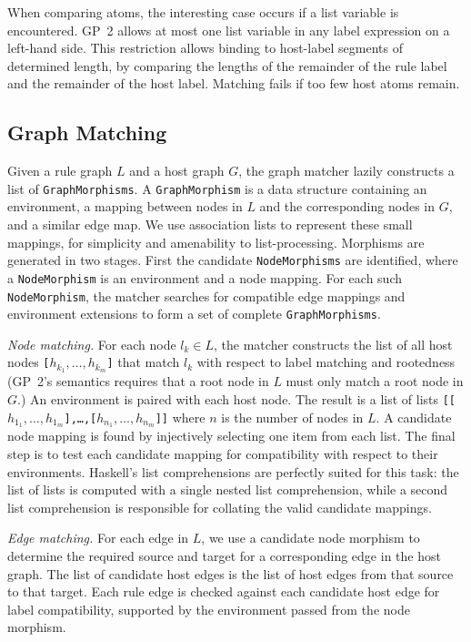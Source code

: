 When comparing atoms, the interesting case occurs if a list variable is encountered. GP~2 allows at most one list variable in any label expression on a left-hand side. This restriction allows binding to host-label segments of determined length, by comparing the lengths of the remainder of the rule label and the remainder of the host label. Matching fails if too few host atoms remain.

\subsection{Graph Matching}\label{sec:graph-match}

Given a rule graph $L$ and a host graph $G$, the graph matcher lazily constructs a list of \texttt{GraphMorphisms}. A \texttt{GraphMorphism} is a data structure containing an environment, a mapping between nodes in $L$ and the corresponding nodes in $G$, and a similar edge map. We use association lists to represent these small mappings, for simplicity and amenability to list-processing.  Morphisms are generated in two stages. First the candidate \texttt{NodeMorphisms} are identified, where a \texttt{NodeMorphism} is an environment and a node mapping. For each such \texttt{NodeMorphism}, the matcher searches for compatible edge mappings and environment extensions to form a set of complete \texttt{GraphMorphisms}.

\vspace{.5\baselineskip}
\noindent
\emph{Node matching.}
For each node $l_k \in L$, the matcher constructs the list of all host nodes \texttt{[$h_{k_1}, \ldots, h_{k_m}$]} that match $l_k$ with respect to label matching and rootedness (GP~2's semantics requires that a root node in $L$ must only match a root node in $G$.) An environment is paired with each host node. The result is a list of lists \texttt{[[$h_{1_1}, \ldots, h_{1_m}$],\ldots,[$h_{n_1}, \ldots, h_{n_m}$]]} where $n$ is the number of nodes in $L$. A candidate node mapping is found by injectively selecting one item from each list. The final step is to test each candidate mapping for compatibility with respect to their environments. Haskell's list comprehensions are perfectly suited for this task: the list of lists is computed with a single nested list comprehension, while a second list comprehension is responsible for collating the valid candidate mappings. 

\vspace{.5\baselineskip}
\noindent
\emph{Edge matching.} 
For each edge in $L$, we use a candidate node morphism to determine the required source and target for a corresponding edge in the host graph. The list of candidate host edges is the list of host edges from that source to that target. Each rule edge is checked against each candidate host edge for label compatibility, supported by the environment passed from the node morphism.

